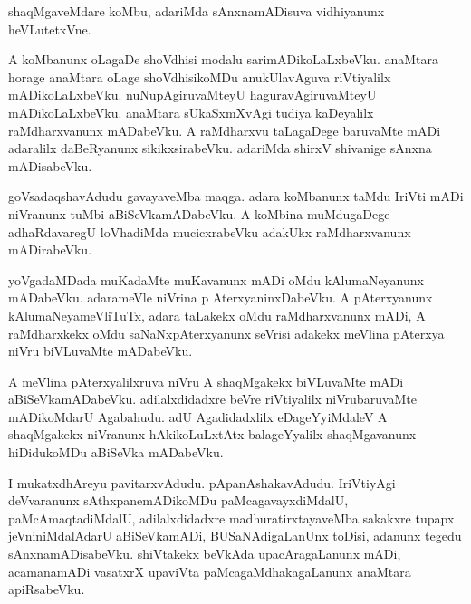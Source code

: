 \documentclass{article}
\begin{document}
\begin{mn}
shaqMgaveMdare  koMbu,  adariMda  sAnxnamADisuva  vidhiyanunx  heVLutetxVne.
\end{mn}

\begin{mn}
A  koMbanunx  oLagaDe  shoVdhisi  modalu  sarimADikoLaLxbeVku.  anaMtara  horage  anaMtara  oLage  
shoVdhisikoMDu  anukUlavAguva  riVtiyalilx  mADikoLaLxbeVku.  nuNupAgiruvaMteyU  haguravAgiruvaMteyU  
mADikoLaLxbeVku.  anaMtara  sUkaSxmXvAgi  tudiya  kaDeyalilx  raMdharxvanunx  mADabeVku.  A  
raMdharxvu  taLagaDege  baruvaMte  mADi  adaralilx  daBeRyanunx  sikikxsirabeVku.  adariMda  
shirxV  shivanige  sAnxna  mADisabeVku.  
\end{mn}

\begin{mn}
goVsadaqshavAdudu  gavayaveMba  maqga.  adara  koMbanunx  taMdu  IriVti  mADi  niVranunx  tuMbi  aBiSeVkamADabeVku.  
A  koMbina  muMdugaDege  adhaRdavaregU  loVhadiMda  mucicxrabeVku  adakUkx  raMdharxvanunx  mADirabeVku.
\end{mn}

\begin{mn}
yoVgadaMDada  muKadaMte  muKavanunx  mADi  oMdu  kAlumaNeyanunx  mADabeVku.  adarameVle  niVrina  p
AterxyaninxDabeVku.  A  pAterxyanunx  kAlumaNeyameVliTuTx,  adara  taLakekx  oMdu  raMdharxvanunx  mADi,  
A  raMdharxkekx  oMdu  saNaNxpAterxyanunx  seVrisi  adakekx  meVlina  pAterxya  niVru  biVLuvaMte  mADabeVku.
\end{mn}

\begin{mn}
A  meVlina  pAterxyalilxruva  niVru  A  shaqMgakekx  biVLuvaMte  mADi  aBiSeVkamADabeVku.  adilalxdidadxre  
beVre  riVtiyalilx  niVrubaruvaMte  mADikoMdarU  Agabahudu.  adU  Agadidadxlilx  eDageYyiMdaleV  A  
shaqMgakekx  niVranunx  hAkikoLuLxtAtx  balageYyalilx  shaqMgavanunx  hiDidukoMDu  aBiSeVka  mADabeVku.
\end{mn}

\begin{mn}
I  mukatxdhAreyu  pavitarxvAdudu.  pApanAshakavAdudu.  IriVtiyAgi  deVvaranunx  sAthxpanemADikoMDu  paMcagavayxdiMdalU,  
paMcAmaqtadiMdalU,  adilalxdidadxre  madhuratirxtayaveMba  sakakxre  tupapx  jeVniniMdalAdarU  aBiSeVkamADi,  
BUSaNAdigaLanUnx  toDisi,  adanunx  tegedu  sAnxnamADisabeVku.  shiVtakekx  beVkAda  upacAragaLanunx  mADi,  
acamanamADi  vasatxrX upaviVta  paMcagaMdhakagaLanunx  anaMtara  apiRsabeVku.
\end{mn}
\end{document}
